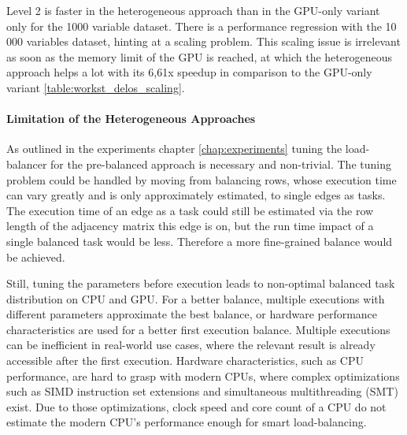 Level 2 is faster in the heterogeneous approach than in the GPU-only variant only for the 1000 variable dataset. There is a performance regression with the 10 000 variables dataset, hinting at a scaling problem.
This scaling issue is irrelevant as soon as the memory limit of the GPU is reached, at which the heterogeneous approach helps a lot with its 6,61x speedup in comparison to the GPU-only variant \ref{table:workst_delos_scaling}.


\paragraph{Limitation of the Heterogeneous Approaches}

As outlined in the experiments chapter \ref{chap:experiments} tuning the load-balancer for the pre-balanced approach is necessary and non-trivial. The tuning problem could be handled by moving from balancing rows, whose execution time can vary greatly and is only approximately estimated, to single edges as tasks. The execution time of an edge as a task could still be estimated via the row length of the adjacency matrix this edge is on, but the run time impact of a single balanced task would be less. Therefore a more fine-grained balance would be achieved.

Still, tuning the parameters before execution leads to non-optimal balanced task distribution on CPU and GPU. For a better balance, multiple executions with different parameters approximate the best balance, or hardware performance characteristics are used for a better first execution balance. Multiple executions can be inefficient in real-world use cases, where the relevant result is already accessible after the first execution. Hardware characteristics, such as CPU performance, are hard to grasp with modern CPUs, where complex optimizations such as SIMD instruction set extensions and simultaneous multithreading (SMT) exist. Due to those optimizations, clock speed and core count of a CPU do not estimate the modern CPU's performance enough for smart load-balancing.

